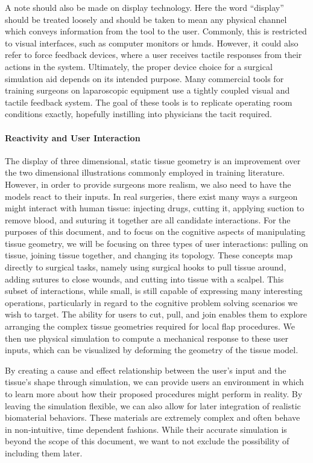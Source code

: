 A note should also be made on display technology. Here the word
``display'' should be treated loosely and should be taken to mean any
physical channel which conveys information from the tool to the
user. Commonly, this is restricted to visual interfaces, such as
computer monitors or \glspl{hmd}. However, it could also refer to
force feedback devices, where a user receives tactile responses from
their actions in the system. Ultimately, the proper device choice for
a surgical simulation aid depends on its intended purpose. Many commercial
tools for training surgeons on laparoscopic equipment use a tightly
coupled visual and tactile feedback system. The goal of these tools is to
replicate operating room conditions exactly, hopefully instilling into
physicians the \gls{tacit} required.

\paragraph{Reactivity and User Interaction}

The display of three dimensional, static tissue geometry is an
improvement over the two dimensional illustrations commonly employed
in training literature. However, in order to provide surgeons more
realism, we also need to have the models react to their inputs. In
real surgeries, there exist many ways a surgeon might interact with
human tissue: injecting drugs, cutting it, applying suction to remove
blood, and suturing it together are all candidate interactions. For
the purposes of this document, and to focus on the cognitive aspects
of manipulating tissue geometry, we will be focusing on three types of
user interactions: pulling on tissue, joining tissue together, and
changing its topology. These concepts map directly to surgical tasks,
namely using surgical hooks to pull tissue around, adding sutures to
close wounds, and cutting into tissue with a scalpel. This subset of
interactions, while small, is still capable of expressing many
interesting operations, particularly in regard to the cognitive
problem solving scenarios we wish to target. The ability for users to
cut, pull, and join enables them to explore arranging the complex
tissue geometries required for local flap procedures. We then use
physical simulation to compute a mechanical response to these user
inputs, which can be visualized by deforming the geometry of the
tissue model.

By creating a cause and effect relationship between the user's input
and the tissue's shape through simulation, we can provide users an
environment in which to learn more about how their proposed procedures
might perform in reality. By leaving the simulation flexible, we can
also allow for later integration of realistic biomaterial
behaviors. These materials are extremely complex and often behave in
non-intuitive, time dependent fashions. While their accurate simulation
is beyond the scope of this document, we want to not exclude the
possibility of including them later.

